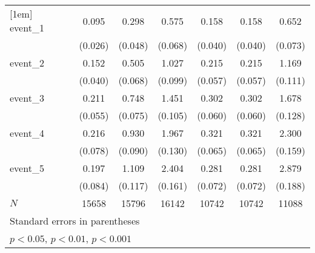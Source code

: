 {\begin{tabular}{l*{6}{c}}
[1em]
event\_1     &       0.095\sym{***}&       0.298\sym{***}&       0.575\sym{***}&       0.158\sym{***}&       0.158\sym{***}&       0.652\sym{***}\\
            &     (0.026)         &     (0.048)         &     (0.068)         &     (0.040)         &     (0.040)         &     (0.073)         \\
[1em]
event\_2     &       0.152\sym{***}&       0.505\sym{***}&       1.027\sym{***}&       0.215\sym{***}&       0.215\sym{***}&       1.169\sym{***}\\
            &     (0.040)         &     (0.068)         &     (0.099)         &     (0.057)         &     (0.057)         &     (0.111)         \\
[1em]
event\_3     &       0.211\sym{***}&       0.748\sym{***}&       1.451\sym{***}&       0.302\sym{***}&       0.302\sym{***}&       1.678\sym{***}\\
            &     (0.055)         &     (0.075)         &     (0.105)         &     (0.060)         &     (0.060)         &     (0.128)         \\
[1em]
event\_4     &       0.216\sym{**} &       0.930\sym{***}&       1.967\sym{***}&       0.321\sym{***}&       0.321\sym{***}&       2.300\sym{***}\\
            &     (0.078)         &     (0.090)         &     (0.130)         &     (0.065)         &     (0.065)         &     (0.159)         \\
[1em]
event\_5     &       0.197\sym{*}  &       1.109\sym{***}&       2.404\sym{***}&       0.281\sym{***}&       0.281\sym{***}&       2.879\sym{***}\\
            &     (0.084)         &     (0.117)         &     (0.161)         &     (0.072)         &     (0.072)         &     (0.188)         \\
\hline
\(N\)       &       15658         &       15796         &       16142         &       10742         &       10742         &       11088         \\
\hline\hline
\multicolumn{7}{l}{\footnotesize Standard errors in parentheses}\\
\multicolumn{7}{l}{\footnotesize \sym{*} \(p<0.05\), \sym{**} \(p<0.01\), \sym{***} \(p<0.001\)}\\
\end{tabular}
}
